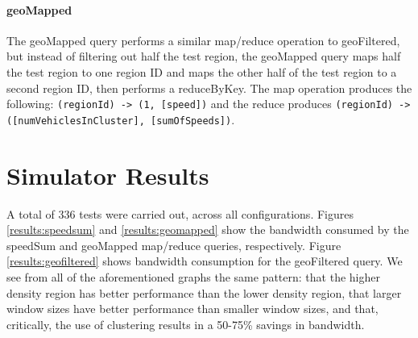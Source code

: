 \documentclass{thesis}
\begin{document}
    \paragraph{geoMapped}
        The geoMapped query performs a similar map/reduce operation to geoFiltered, but instead of filtering out half the
        test region, the geoMapped query maps half the test region to one region ID and maps the other half of the
        test region to a second region ID, then performs a reduceByKey. The map operation produces the following:
        \verb|(regionId) -> (1, [speed])| and the reduce produces \verb|(regionId) -> ([numVehiclesInCluster], [sumOfSpeeds])|.

\section{Simulator Results}

   A total of 336 tests were carried out, across all configurations. 
   Figures \ref{results:speedsum} and \ref{results:geomapped} show the bandwidth consumed by the speedSum
   and geoMapped map/reduce queries, respectively. Figure \ref{results:geofiltered} shows bandwidth consumption
   for the geoFiltered query. We see from all of the aforementioned graphs the same pattern: that
   the higher density region has better performance than the lower density region, that larger window
   sizes have better performance than smaller window sizes, and that, critically, the use of clustering
   results in a 50-75\% savings in bandwidth.
\end{document}
